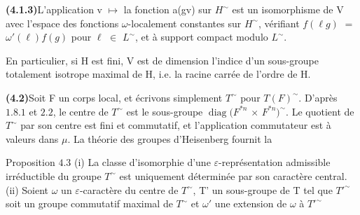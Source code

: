 \documentclass[10pt,a4paper]{article}
\begin{document}
\par\noindent\textbf{(4.1.3)}\quad L'application v $\mapsto{}$ la fonction a(gv) sur $H^\sim$ est un isomorphisme de V avec l'espace des fonctions $\omega{}$-localement constantes sur $H^\sim$, vérifiant $f(\ell{}g)$ $=$ $\omega{}'(\ell{})f(g)$ pour $\ell{}$ $\in{}$ $L^\sim$, et à support compact modulo $L^\sim$.\par
\par En particulier, si H est fini, V est de dimension l'indice d'un sous-groupe totalement isotrope maximal de H, i.e. la racine carrée de l'ordre de H.\par
\par\noindent\textbf{(4.2)}\quad Soit F un corps local, et écrivons simplement $T^\sim$ pour $T(F)^\sim$. D'après $1.8.1$ et $2.2$, le centre de $T^\sim$ est le sous-groupe $\operatorname{diag}(F^{*n}$ $\times{}$ $F^{*n})^\sim$. Le quotient de $T^\sim$ par son centre est fini et commutatif, et l'application commutateur est à valeurs dans $\mu{}$. La théorie des groupes d'Heisenberg fournit la\par
\par Proposition $4.3$ (i) La classe d'isomorphie d'une $\varepsilon{}$-représentation admissible irréductible du groupe $T^\sim$ est uniquement déterminée par son caractère central. (ii) Soient $\omega{}$ un $\varepsilon{}$-caractère du centre de $T^\sim$, T' un sous-groupe de T tel que $T'^\sim$ soit un groupe commutatif maximal de $T^\sim$ et $\omega{}'$ une extension de $\omega{}$ à $T'^\sim$\par
\end{document}
